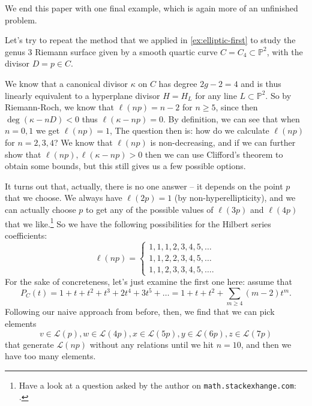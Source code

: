 \documentclass[10pt,notitlepage]{article}
\numberwithin{equation}{subsection}
\newcommand{\pee}{\mathbb{P}}
\begin{document}
        We end this paper with one final example, which is again more of an unfinished problem.

        \begin{example}
            Let's try to repeat the method that we applied in \cref{ex:elliptic-first} to study the genus $3$ Riemann surface given by a smooth quartic curve $C=C_4\subset\pee^2$, with the divisor $D=p\in C$.

            We know that a canonical divisor $\kappa$ on $C$ has degree $2g-2=4$ and is thus linearly equivalent to a hyperplane divisor $H=H_L$ for any line $L\subset\mathbb{P}^2$.
            So by Riemann-Roch, we know that $\ell(np)=n-2$ for $n\geqslant5$, since then $\deg(\kappa-nD)<0$ thus $\ell(\kappa-np)=0$.
            By definition, we can see that when $n=0,1$ we get $\ell(np)=1$,
            The question then is: how do we calculate $\ell(np)$ for $n=2,3,4$?
            We know that $\ell(np)$ is non-decreasing, and if we can further show that $\ell(np),\ell(\kappa-np)>0$ then we can use Clifford's theorem to obtain some bounds, but this still gives us a few possible options.

            It turns out that, actually, there is no one answer -- it depends on the point $p$ that we choose.
            We always have $\ell(2p)=1$ (by non-hyperellipticity), and we can actually choose $p$ to get any of the possible values of $\ell(3p)$ and $\ell(4p)$ that we like.\footnote{
                Have a look at a question asked by the author on \texttt{math.stackexhange.com}: \cite{Anonymous:5kIQ8xYm}.
            }
            So we have the following possibilities for the Hilbert series coefficients:
            \[
                \ell(np) =
                \begin{cases}
                    1,1,1,2,3,4,5,\ldots \\
                    1,1,2,2,3,4,5,\ldots \\
                    1,1,2,3,3,4,5,\ldots.
                \end{cases}
            \]
            For the sake of concreteness, let's just examine the first one here: assume that
            \[
                P_C(t) = 1+t+t^2+t^3+2t^4+3t^5+\ldots = 1+t+t^2+\sum_{m\geqslant4} (m-2)t^m.
            \]
            Following our naive approach from before, then, we find that we can pick elements
            \[
                v\in\mathcal{L}(p), w\in\mathcal{L}(4p), x\in\mathcal{L}(5p), y\in\mathcal{L}(6p), z\in\mathcal{L}(7p)
            \]
            that generate $\mathcal{L}(np)$ without any relations until we hit $n=10$, and then we have too many elements.


\end{example}
\end{document}
